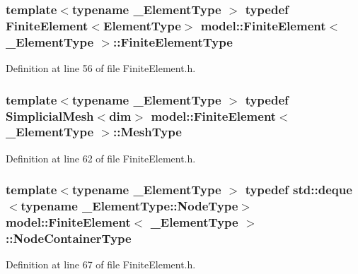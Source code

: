 \subsubsection[{Finite\+Element\+Type}]{\setlength{\rightskip}{0pt plus 5cm}template$<$typename \+\_\+\+Element\+Type $>$ typedef {\bf Finite\+Element}$<${\bf Element\+Type}$>$ {\bf model\+::\+Finite\+Element}$<$ \+\_\+\+Element\+Type $>$\+::{\bf Finite\+Element\+Type}}\label{classmodel_1_1_finite_element_a52dc23d4d24a1a38ff0f90d5708c02a8}


Definition at line 56 of file Finite\+Element.\+h.

\hypertarget{classmodel_1_1_finite_element_a4651eeb68711db1117585b38b3161042}{}
\subsubsection[{Mesh\+Type}]{\setlength{\rightskip}{0pt plus 5cm}template$<$typename \+\_\+\+Element\+Type $>$ typedef {\bf Simplicial\+Mesh}$<${\bf dim}$>$ {\bf model\+::\+Finite\+Element}$<$ \+\_\+\+Element\+Type $>$\+::{\bf Mesh\+Type}}\label{classmodel_1_1_finite_element_a4651eeb68711db1117585b38b3161042}


Definition at line 62 of file Finite\+Element.\+h.

\hypertarget{classmodel_1_1_finite_element_ac66ce55971f21abdbdea01dd7f391c70}{}
\subsubsection[{Node\+Container\+Type}]{\setlength{\rightskip}{0pt plus 5cm}template$<$typename \+\_\+\+Element\+Type $>$ typedef std\+::deque$<$typename {\bf \+\_\+\+Element\+Type\+::\+Node\+Type}$>$ {\bf model\+::\+Finite\+Element}$<$ \+\_\+\+Element\+Type $>$\+::{\bf Node\+Container\+Type}}\label{classmodel_1_1_finite_element_ac66ce55971f21abdbdea01dd7f391c70}


Definition at line 67 of file Finite\+Element.\+h.

\hypertarget{classmodel_1_1_finite_element_ac8d169f08fe81612ccb6373ea8ce0902}{}
